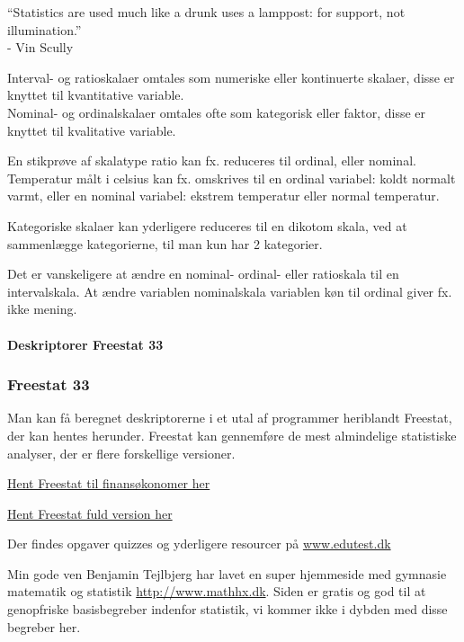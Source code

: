 \documentclass[]{book}
\let\oldparagraph\paragraph
\renewcommand{\paragraph}[1]{\oldparagraph{#1}\mbox{}}
\theoremstyle{definition}
\theoremstyle{definition}
\theoremstyle{definition}
\theoremstyle{remark}
\begin{document}
``Statistics are used much like a drunk uses a lamppost: for support,
not illumination.''\\
- Vin Scully

Interval- og ratioskalaer omtales som numeriske eller kontinuerte
skalaer, disse er knyttet til kvantitative variable.\\
Nominal- og ordinalskalaer omtales ofte som kategorisk eller faktor,
disse er knyttet til kvalitative variable.

En stikprøve af skalatype ratio kan fx. reduceres til ordinal, eller
nominal. Temperatur målt i celsius kan fx. omskrives til en ordinal
variabel: koldt normalt varmt, eller en nominal variabel: ekstrem
temperatur eller normal temperatur.

Kategoriske skalaer kan yderligere reduceres til en dikotom skala, ved
at sammenlægge kategorierne, til man kun har 2 kategorier.

Det er vanskeligere at ændre en nominal- ordinal- eller ratioskala til
en intervalskala. At ændre variablen nominalskala variablen køn til
ordinal giver fx. ikke mening.

\hypertarget{deskriptorer-freestat-33}{%
\paragraph{Deskriptorer Freestat 33}\label{deskriptorer-freestat-33}}

\hypertarget{freestat-33}{%
\subsubsection{Freestat 33}\label{freestat-33}}

Man kan få beregnet deskriptorerne i et utal af programmer heriblandt
Freestat, der kan hentes herunder. Freestat kan gennemføre de mest
almindelige statistiske analyser, der er flere forskellige versioner.

\href{https://www.dropbox.com/s/a2jztexbxfzcli0/FREESTAT.xlsx?dl=1}{Hent
Freestat til finansøkonomer her}

\href{https://www.dropbox.com/s/th8q95lf864npie/FREESTATfin.xlsx?dl=1}{Hent
Freestat fuld version her}

Der findes opgaver quizzes og yderligere resourcer på
\href{http://www.edutest.dk}{www.edutest.dk}

Min gode ven Benjamin Tejlbjerg har lavet en super hjemmeside med
gymnasie matematik og statistik
\href{http://www.mathhx.dk/?q=node/117}{http://www.mathhx.dk}. Siden er
gratis og god til at genopfriske basisbegreber indenfor statistik, vi
kommer ikke i dybden med disse begreber her.
\end{document}
